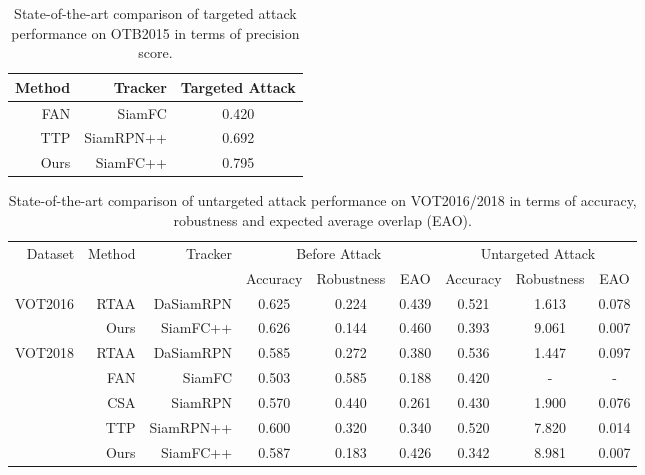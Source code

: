 \documentclass[journal]{IEEEtran}
\begin{document}
\begin{table}[t]
  \centering
  \caption{State-of-the-art comparison of targeted attack performance on OTB2015 in terms of precision score.}
  \begin{tabular}{@{}rrc@{}}
  \toprule
  Method & Tracker &  Targeted Attack \\
  \midrule
  FAN & SiamFC  &0.420 \\
  TTP & SiamRPN++ &0.692 \\
  \midrule
  Ours & SiamFC++  &0.795 \\ \bottomrule
  \end{tabular}
  \label{tab:SOTA1}
  \vspace{-3mm}
\end{table}
\begin{table}[t]
  \centering
  \caption{State-of-the-art comparison of untargeted attack performance on VOT2016/2018 in terms of accuracy, robustness and expected average overlap (EAO).}
  \begin{tabular}{rrrcccccc}
  \toprule
  \multirow{2}{*}[-2pt]{Dataset} & \multirow{2}{*}[-2pt]{Method} & \multirow{2}{*}[-2pt]{Tracker} & \multicolumn{3}{c}{Before Attack} & \multicolumn{3}{c}{Untargeted Attack} \\ \cmidrule{4-9}
                           &                         &                          & Accuracy   & Robustness  & EAO    & Accuracy    & Robustness    & EAO     \\ \midrule
  \multirow{2}{*}{VOT2016} & RTAA                    & DaSiamRPN                & 0.625      & 0.224       & 0.439  & 0.521       & 1.613         & 0.078   \\
                           & Ours                    & SiamFC++                 & 0.626      & 0.144       & 0.460  & 0.393       & 9.061         & 0.007   \\ \midrule
  \multirow{5}{*}{VOT2018} & RTAA                    & DaSiamRPN                & 0.585      & 0.272       & 0.380  & 0.536       & 1.447         & 0.097   \\
                           & FAN                     & SiamFC                   & 0.503      & 0.585       & 0.188  & 0.420       & -             & -       \\
                           & CSA                     & SiamRPN                  & 0.570      & 0.440       & 0.261  & 0.430       & 1.900         & 0.076   \\
                           & TTP                     & SiamRPN++                & 0.600      & 0.320       & 0.340  & 0.520       & 7.820         & 0.014   \\
                           & Ours                    & SiamFC++                 & 0.587      & 0.183       & 0.426  & 0.342       & 8.981         & 0.007   \\ \bottomrule
  \end{tabular}
  \label{tab:sota_vot}
  \vspace{-4mm}
\end{table}
\end{document}
